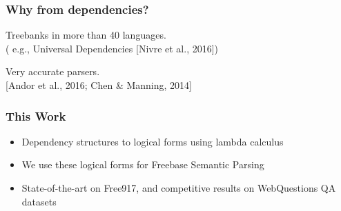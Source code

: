 \documentclass[mathserif,12pt]{beamer}
\begin{document}
\begin{frame}
 \frametitle{Why from dependencies?}
 Treebanks in more than 40 languages.\\
 {\scriptsize ( e.g., Universal Dependencies [Nivre et al., 2016])}
 
 \vspace{1cm}
 Very accurate parsers.\\
 {\scriptsize [Andor et al., 2016; Chen \& Manning, 2014]}
 
\end{frame}

\begin{frame}
 \frametitle{This Work}
  \begin{itemize}
   \item Dependency structures to logical forms using lambda calculus
   \vspace{1cm}
   \item We use these logical forms for Freebase Semantic Parsing
   \vspace{1cm}
   
   \item State-of-the-art on Free917, and competitive results on WebQuestions QA datasets
  \end{itemize}
\end{frame}
\end{document}
